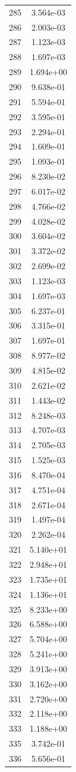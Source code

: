 \documentclass[12pt]{article}
\begin{document}
\begin{longtable}{@{}cc@{}}
285 & 3.564e-03 \\
286 & 2.003e-03 \\
287 & 1.123e-03 \\
288 & 1.697e-03 \\
289 & 1.694e+00 \\
290 & 9.638e-01 \\
291 & 5.594e-01 \\
292 & 3.595e-01 \\
293 & 2.294e-01 \\
294 & 1.609e-01 \\
295 & 1.093e-01 \\
296 & 8.230e-02 \\
297 & 6.017e-02 \\
298 & 4.766e-02 \\
299 & 4.028e-02 \\
300 & 3.604e-02 \\
301 & 3.372e-02 \\
302 & 2.699e-02 \\
303 & 1.123e-03 \\
304 & 1.697e-03 \\
305 & 6.237e-01 \\
306 & 3.315e-01 \\
307 & 1.697e-01 \\
308 & 8.977e-02 \\
309 & 4.815e-02 \\
310 & 2.621e-02 \\
311 & 1.443e-02 \\
312 & 8.248e-03 \\
313 & 4.707e-03 \\
314 & 2.705e-03 \\
315 & 1.525e-03 \\
316 & 8.470e-04 \\
317 & 4.751e-04 \\
318 & 2.671e-04 \\
319 & 1.497e-04 \\
320 & 2.262e-04 \\
321 & 5.140e+01 \\
322 & 2.948e+01 \\
323 & 1.735e+01 \\
324 & 1.136e+01 \\
325 & 8.233e+00 \\
326 & 6.588e+00 \\
327 & 5.704e+00 \\
328 & 5.241e+00 \\
329 & 3.913e+00 \\
330 & 3.162e+00 \\
331 & 2.720e+00 \\
332 & 2.118e+00 \\
333 & 1.188e+00 \\
335 & 3.742e-01 \\
336 & 5.656e-01 \\

\bottomrule
\end{longtable}
\end{document}
